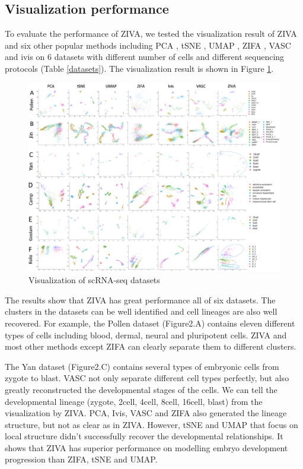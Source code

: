 \subsection{Visualization performance}
To evaluate the performance of ZIVA, we tested the visualization result of ZIVA and six other popular methods including PCA \cite{Abdi2010}, tSNE \cite{maaten2008visualizing}, UMAP \cite{McInnes2018}, ZIFA \cite{Pierson2015}, VASC \cite{Wang2018} and ivis \cite{Szubert2019} on 6 datasets with different number of cells and different sequencing protocols (Table \ref{datasets}). The visualization result is shown in Figure \ref{vis}.
\begin{figure}[htb!]
    \centering
    \includegraphics[width=1\textwidth]{figures/myfigures/visualizations.png}
    \caption{Visualization of scRNA-seq datasets}
    \label{vis}
\end{figure}
The results show that ZIVA has great performance all of six datasets. The clusters in the datasets can be well identified and cell lineages are also well recovered. For example, the Pollen dataset (Figure2.A) contains eleven different types of cells including blood, dermal, neural and pluripotent cells. ZIVA and most other methods except ZIFA can clearly separate them to different clusters. 

The Yan dataset (Figure2.C) contains several types of embryonic cells from zygote to blast. VASC not only separate different cell types perfectly, but also greatly reconstructed the developmental stages of the cells. We can tell the developmental lineage (zygote, 2cell, 4cell, 8cell, 16cell, blast) from the visualization by ZIVA. PCA, Ivis, VASC and ZIFA also generated the lineage structure, but not as clear as in ZIVA. However, tSNE and UMAP that focus on local structure didn’t successfully recover the developmental relationships. It shows that ZIVA has superior performance on modelling embryo development progression than ZIFA, tSNE and UMAP. 

